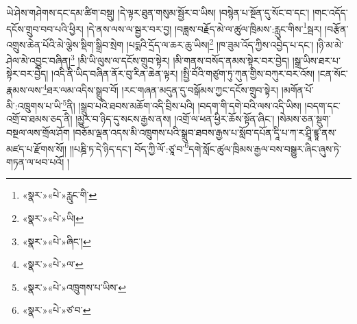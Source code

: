 ཡེ་ཤེས་གཤེགས་དང་དམ་ཚིག་བསྡུ། །དེ་ལྟར་ཐུན་གསུམ་སྦྱོར་བ་ཡིས། །བསྙེན་པ་སྔོན་དུ་སོང་བ་དང་། །གང་འདོད་དངོས་གྲུབ་བབ་པའི་ཕྱིར། །དེ་ནས་ལས་ལ་སྦྱར་བར་བྱ། །བཟླས་བརྗོད་མེ་ལ་ཚུལ་ཁྲིམས་:རླུང་གིས་\footnote{«སྣར་»«པེ་»རླུང་གི་}སྦར། །བརྩོན་འགྲུས་ཆེན་པོའི་མེ་ལྕེས་སྡིག་སྒྲིབ་སྲེག །པདྨའི་དྲོད་ལ་ཆར་ཆུ་ཡིས།\footnote{«སྣར་»«པེ་»ཡི།} །ཁ་ཟུམ་འོད་ཀྱིས་འབྱེད་པ་དང་། །ཉི་མ་མེ་ཤེལ་མེ་འབྱུང་བཞིན།\footnote{«སྣར་»«པེ་»ཞིང་།} །མི་ཡི་ལུས་ལ་དངོས་གྲུབ་སྟེར། །མི་གནས་བསོད་ནམས་སྟེར་བར་བྱེད། །སྒྲ་ཡིས་ཐར་པ་སྟེར་བར་བྱེད། །འདི་ནི་ཡིད་བཞིན་ནོར་བུ་རིན་ཆེན་ལྟར། །སྤྱི་བོའི་གཙུག་ཏུ་ཀུན་གྱིས་བཀུར་བར་འོས། །ངན་སོང་རྣམས་ལས་\footnote{«སྣར་»«པེ་»ལ་}ཐར་ལམ་འདིས་སྒྲུབ་བོ། །རང་གཞན་མདུན་དུ་བསྒོམས་ཀྱང་དངོས་གྲུབ་སྟེར། །མགོན་པོ་མི་:འཁྲུགས་པ་ཡི་\footnote{«སྣར་»«པེ་»འཁྲུགས་པ་ཡིས་}ནི། །སྒྲུབ་པའི་ཐབས་མཆོག་འདི་བྲིས་པའི། །བདག་གི་དགེ་བའི་ལས་འདི་ཡིས། །བདག་དང་འགྲོ་བ་ཐམས་ཅད་ནི། །མྱུར་བ་ཉིད་དུ་སངས་རྒྱས་ནས། །འགྲོ་ལ་ཕན་ཕྱིར་ཆོས་སྟོན་ཞིང་། །སེམས་ཅན་སྡུག་བསྔལ་ལས་གྲོལ་ཤོག །བཅོམ་ལྡན་འདས་མི་འཁྲུགས་པའི་སྒྲུབ་ཐབས་རྒྱས་པ་སློབ་དཔོན་དཱི་པ་ཀ་ར་ཤྲཱི་ཛྙཱ་ནས་མཛད་པ་རྫོགས་སོ།། །།པཎྜི་ཏ་དེ་ཉིད་དང་། བོད་ཀྱི་ལོ་:ཙཱ་བ་\footnote{«སྣར་»«པེ་»ཙ་བ་}དགེ་སློང་ཚུལ་ཁྲིམས་རྒྱལ་བས་བསྒྱུར་ཞིང་ཞུས་ཏེ་གཏན་ལ་ཕབ་པའོ། ། 
